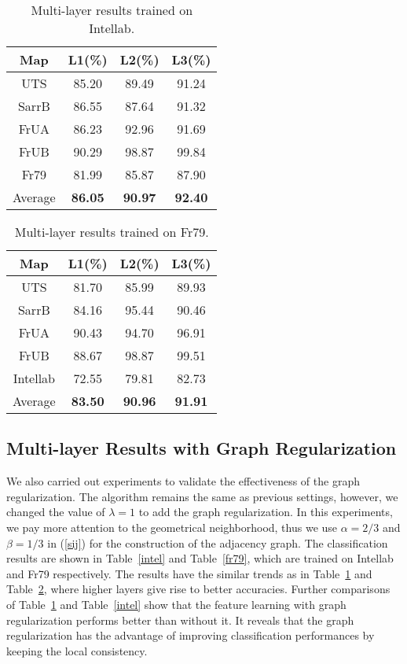 \documentclass[letterpaper, 10 pt, conference]{ieeeconf}  %
\begin{document}
\begin{table}[tpb]
\caption{Multi-layer results trained on Intellab.}
\label{intel_ng}
\begin{center}
\begin{tabular}{cccc}
Map     &L1(\%)     &L2(\%)     &L3(\%)   \\
\hline
UTS     &85.20 	    &89.49      &91.24\\
SarrB   &86.55 	    &87.64      &91.32\\
FrUA    &86.23 	    &92.96      &91.69\\
FrUB    &90.29      &98.87      &99.84\\
Fr79    &81.99      &85.87      &87.90\\
Average     &\textbf{86.05}      &\textbf{90.97}      &\textbf{92.40}\\
\end{tabular}
\end{center}
\end{table}


\begin{table}[tpb]
\caption{Multi-layer results trained on Fr79.}
\label{fr79_ng}
\begin{center}
\begin{tabular}{cccc}
Map     &L1(\%)     &L2(\%)     &L3(\%)   \\
\hline
UTS     &81.70 	    &85.99      &89.93\\
SarrB   &84.16 	    &95.44      &90.46\\
FrUA    &90.43 	    &94.70      &96.91\\
FrUB    &88.67      &98.87      &99.51\\
Intellab    &72.55      &79.81      &82.73\\
Average     &\textbf{83.50}      &\textbf{90.96}      &\textbf{91.91}\\
\end{tabular}
\end{center}
\end{table}


\subsection{Multi-layer Results with Graph Regularization}

We also carried out experiments to validate the effectiveness of the graph regularization. The algorithm remains the same as previous settings, however, we changed  the value of  $\lambda=1$ to add the graph regularization. In this experiments, we pay more attention to the geometrical neighborhood, thus we use $\alpha=2/3$ and $\beta=1/3$ in (\ref{sij}) for the construction of the adjacency graph. The classification results are shown in Table~\ref{intel} and Table~\ref{fr79}, which are trained on Intellab and Fr79 respectively. The results have the similar trends as in Table~\ref{intel_ng} and Table~\ref{fr79_ng}, where higher layers give rise to better accuracies.  Further comparisons of Table~\ref{intel_ng} and Table~\ref{intel} show that the feature learning with graph regularization performs better than without it. It reveals that the graph regularization has the advantage of improving classification performances by keeping the local consistency.
\end{document}
